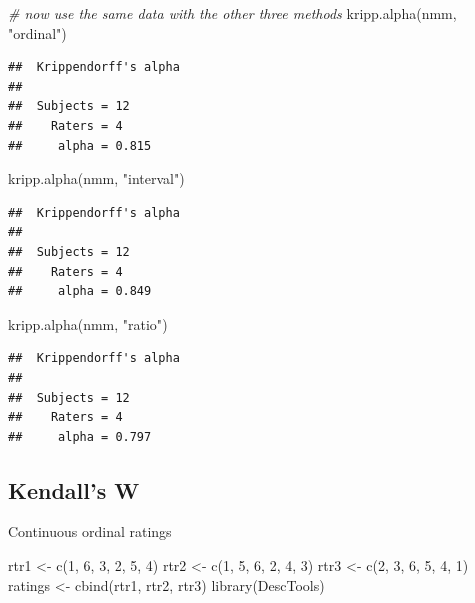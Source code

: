 \documentclass[
]{book}
\newenvironment{Shaded}{\begin{snugshade}}{\end{snugshade}}
\newcommand{\CommentTok}[1]{\textcolor[rgb]{0.56,0.35,0.01}{\textit{#1}}}
\newcommand{\DecValTok}[1]{\textcolor[rgb]{0.00,0.00,0.81}{#1}}
\newcommand{\FunctionTok}[1]{\textcolor[rgb]{0.00,0.00,0.00}{#1}}
\newcommand{\NormalTok}[1]{#1}
\newcommand{\OtherTok}[1]{\textcolor[rgb]{0.56,0.35,0.01}{#1}}
\newcommand{\StringTok}[1]{\textcolor[rgb]{0.31,0.60,0.02}{#1}}
\begin{document}
\begin{Shaded}
\begin{Highlighting}[]
 \CommentTok{\# now use the same data with the other three methods}
 \FunctionTok{kripp.alpha}\NormalTok{(nmm, }\StringTok{"ordinal"}\NormalTok{)}
\end{Highlighting}
\end{Shaded}

\begin{verbatim}
##  Krippendorff's alpha
## 
##  Subjects = 12 
##    Raters = 4 
##     alpha = 0.815
\end{verbatim}

\begin{Shaded}
\begin{Highlighting}[]
 \FunctionTok{kripp.alpha}\NormalTok{(nmm, }\StringTok{"interval"}\NormalTok{)}
\end{Highlighting}
\end{Shaded}

\begin{verbatim}
##  Krippendorff's alpha
## 
##  Subjects = 12 
##    Raters = 4 
##     alpha = 0.849
\end{verbatim}

\begin{Shaded}
\begin{Highlighting}[]
 \FunctionTok{kripp.alpha}\NormalTok{(nmm, }\StringTok{"ratio"}\NormalTok{) }
\end{Highlighting}
\end{Shaded}

\begin{verbatim}
##  Krippendorff's alpha
## 
##  Subjects = 12 
##    Raters = 4 
##     alpha = 0.797
\end{verbatim}

\hypertarget{kendalls-w}{%
\subsection{Kendall's W}\label{kendalls-w}}

Continuous ordinal ratings

\begin{Shaded}
\begin{Highlighting}[]
\NormalTok{rtr1 }\OtherTok{\textless{}{-}} \FunctionTok{c}\NormalTok{(}\DecValTok{1}\NormalTok{, }\DecValTok{6}\NormalTok{, }\DecValTok{3}\NormalTok{, }\DecValTok{2}\NormalTok{, }\DecValTok{5}\NormalTok{, }\DecValTok{4}\NormalTok{)}
\NormalTok{rtr2 }\OtherTok{\textless{}{-}} \FunctionTok{c}\NormalTok{(}\DecValTok{1}\NormalTok{, }\DecValTok{5}\NormalTok{, }\DecValTok{6}\NormalTok{, }\DecValTok{2}\NormalTok{, }\DecValTok{4}\NormalTok{, }\DecValTok{3}\NormalTok{)}
\NormalTok{rtr3 }\OtherTok{\textless{}{-}} \FunctionTok{c}\NormalTok{(}\DecValTok{2}\NormalTok{, }\DecValTok{3}\NormalTok{, }\DecValTok{6}\NormalTok{, }\DecValTok{5}\NormalTok{, }\DecValTok{4}\NormalTok{, }\DecValTok{1}\NormalTok{)}
\NormalTok{ratings }\OtherTok{\textless{}{-}} \FunctionTok{cbind}\NormalTok{(rtr1, rtr2, rtr3)}
\FunctionTok{library}\NormalTok{(DescTools)}
\end{Highlighting}
\end{Shaded}
\end{document}
